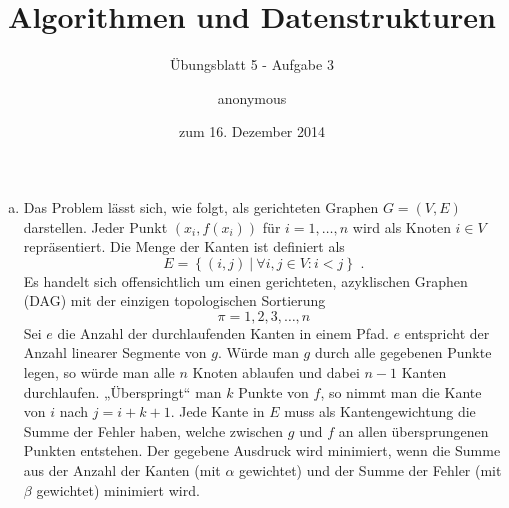 \documentclass[a4paper]{scrartcl}
\title{Algorithmen und Datenstrukturen}
\subtitle{Übungsblatt 5 - Aufgabe 3}
\author{
    anonymous
}
\date{zum 16. Dezember 2014}
\begin{document}
\maketitle

\begin{enumerate}[(a)]
    \item
        Das Problem lässt sich, wie folgt, als gerichteten Graphen $G = (V, E)$
        darstellen.
        Jeder Punkt $(x_i, f(x_i))$ für $i = 1,  \ldots, n$ wird als Knoten
        $i \in V$ repräsentiert.
        Die Menge der Kanten ist definiert als
        \begin{equation}
            E = \left\{ (i, j) \ \vert\  \forall i, j \in V : i < j \right\}
            \text{ .}
        \end{equation}
        Es handelt sich offensichtlich um einen gerichteten, azyklischen Graphen
        (DAG) mit der einzigen topologischen Sortierung
        \begin{equation}
            \pi = 1, 2, 3, \ldots, n
        \end{equation}
        Sei $e$ die Anzahl der durchlaufenden Kanten in einem Pfad.
        $e$ entspricht der Anzahl linearer Segmente von $g$.
        Würde man $g$ durch alle gegebenen Punkte legen, so würde man alle
        $n$ Knoten ablaufen und dabei $n-1$ Kanten durchlaufen.
        „Überspringt“ man $k$ Punkte von $f$, so nimmt man die Kante von $i$
        nach $j = i+k+1$.
        Jede Kante in $E$ muss als Kantengewichtung die Summe der Fehler haben,
        welche zwischen $g$ und $f$ an allen übersprungenen Punkten entstehen.
        Der gegebene Ausdruck wird minimiert, wenn die Summe aus der Anzahl der
        Kanten (mit $\alpha$ gewichtet) und der Summe der Fehler (mit $\beta$
        gewichtet) minimiert wird.
        

\end{enumerate}
\end{document}
